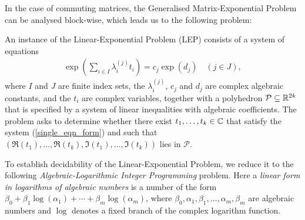 In the case of commuting matrices, the Generalised Matrix-Exponential
Problem can be analysed block-wise, which leads us to the following
problem:

\begin{definition}
  An instance of the Linear-Exponential Problem (LEP) consists of a system
  of equations
\begin{align}
\label{single_eqn_form}
  \exp\left(\sum_{i \in I} \lambda_i^{(j)} t_i \right) = c_j \exp (d_j)
\quad (j \in J),
\end{align}
where $I$ and $J$ are finite index sets, the $\lambda_i^{(j)}$, $c_j$
and $d_j$ are complex algebraic constants, and the $t_i$ are complex
variables, together with a polyhedron
$\mathcal{P} \subseteq \mathbb{R}^{2k}$ that is specified by a system
of linear inequalities with algebraic coefficients.  The problem asks
to determine whether there exist $t_1,\ldots,t_k\in \mathbb{C}$ that
satisfy the system (\ref{single_eqn_form}) and such that
$(\Re(t_1),\ldots,\Re(t_k),\Im(t_1),\ldots,\Im(t_k))$
lies in $\mathcal{P}$.
\label{def:LEP}
\end{definition}

To establish decidability of the Linear-Exponential Problem, we reduce
it to the following
\emph{Algebraic-Logarithmic Integer Programming}
problem.  Here a \emph{linear form in logarithms of algebraic numbers}
is a number of the form
$\beta_{0} + \beta_{1} \log(\alpha_{1}) + \cdots + \beta_{m}
\log(\alpha_{m})$,
where
$\beta_{0}, \alpha_{1}, \beta_{1}, \ldots, \alpha_{m}, \beta_{m}$ are
algebraic numbers and $\log$ denotes a fixed branch of the complex
logarithm function.



